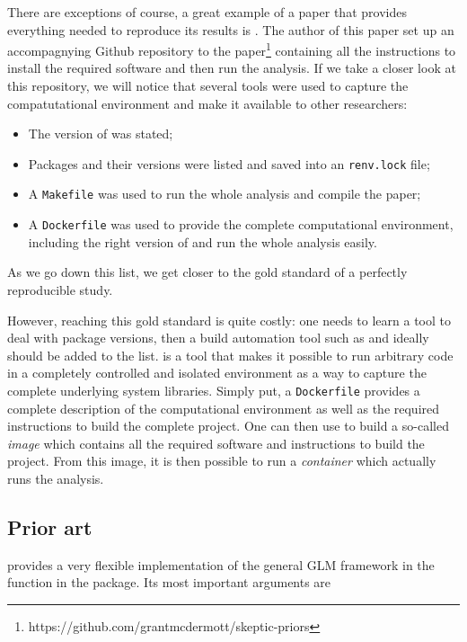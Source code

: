 \documentclass[
  article]{jss}
\providecommand{\tightlist}{%
  \setlength{\itemsep}{0pt}\setlength{\parskip}{0pt}}\usepackage{longtable,booktabs,array}
\newcommand{\fct}[1]{\code{#1()}}
\begin{document}
There are exceptions of course, a great example of a paper that provides
everything needed to reproduce its results is \citet{mcdermott2021}. The
author of this paper set up an accompagnying Github repository to the
paper\footnote{https://github.com/grantmcdermott/skeptic-priors}
containing all the instructions to install the required software and
then run the analysis. If we take a closer look at this repository, we
will notice that several tools were used to capture the compatutational
environment and make it available to other researchers:

\begin{itemize}
\tightlist
\item
  The version of  was stated;
\item
  Packages and their versions were listed and saved into an
  \texttt{renv.lock} file;
\item
  A \texttt{Makefile} was used to run the whole analysis and compile the
  paper;
\item
  A \texttt{Dockerfile} was used to provide the complete computational
  environment, including the right version of  and run the
  whole analysis easily.
\end{itemize}

As we go down this list, we get closer to the gold standard of a
perfectly reproducible study.

However, reaching this gold standard is quite costly: one needs to learn
a tool to deal with package versions, then a build automation tool such
as  and ideally  should be added to the
list.  is a tool that makes it possible to run
arbitrary code in a completely controlled and isolated environment as a
way to capture the complete underlying system libraries. Simply put, a
\texttt{Dockerfile} provides a complete description of the computational
environment as well as the required instructions to build the complete
project. One can then use  to build a so-called
\emph{image} which contains all the required software and instructions
to build the project. From this image, it is then possible to run a
\emph{container} which actually runs the analysis.

\subsection{Prior art}\label{subsec-prior}

 provides a very flexible implementation of the general GLM
framework in the function \fct{glm} \citet{ChambersHastie1992} in the
 package. Its most important arguments are
\end{document}
